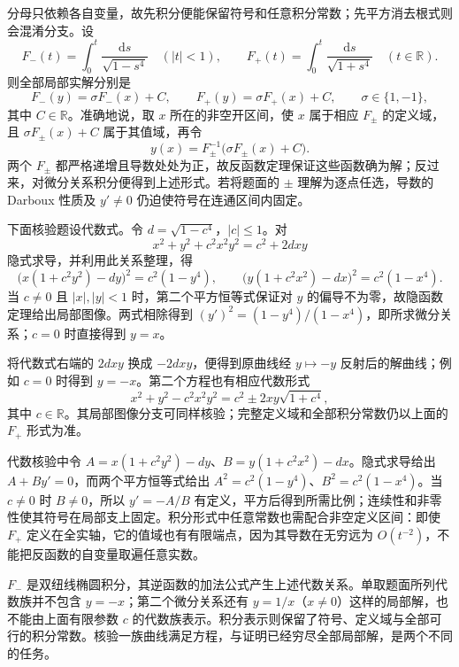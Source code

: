 \documentclass[12pt,fontset=fandol]{ctexart}
\begin{document}
\begin{solve}\label{ans:fin16-low:10}

分母只依赖各自变量，故先积分便能保留符号和任意积分常数；先平方消去根式则会混淆分支。设
\[
F_-(t)=\int_0^t\frac{\mathrm ds}{\sqrt{1-s^4}}\quad(|t|<1),
\qquad
F_+(t)=\int_0^t\frac{\mathrm ds}{\sqrt{1+s^4}}\quad(t\in\mathbb R).
\]
则全部局部实解分别是
\[
\boxed{F_-(y)=\sigma F_-(x)+C},\qquad
\boxed{F_+(y)=\sigma F_+(x)+C},\qquad\sigma\in\{1,-1\},
\]
其中 $C\in\mathbb R$。准确地说，取 $x$ 所在的非空开区间，使 $x$ 属于相应 $F_\pm$ 的定义域，且 $\sigma F_\pm(x)+C$ 属于其值域，再令
\[
y(x)=F_\pm^{-1}\bigl(\sigma F_\pm(x)+C\bigr).
\]
两个 $F_\pm$ 都严格递增且导数处处为正，故反函数定理保证这些函数确为解；反过来，对微分关系积分便得到上述形式。若将题面的 $\pm$ 理解为逐点任选，导数的 Darboux 性质及 $y'\ne0$ 仍迫使符号在连通区间内固定。

下面核验题设代数式。令 $d=\sqrt{1-c^4}$，$|c|\le1$。对
\[
x^2+y^2+c^2x^2y^2=c^2+2dxy
\]
隐式求导，并利用此关系整理，得
\[
\bigl(x(1+c^2y^2)-dy\bigr)^2=c^2(1-y^4),\qquad
\bigl(y(1+c^2x^2)-dx\bigr)^2=c^2(1-x^4).
\]
当 $c\ne0$ 且 $|x|,|y|<1$ 时，第二个平方恒等式保证对 $y$ 的偏导不为零，故隐函数定理给出局部图像。两式相除得到 $(y')^2=(1-y^4)/(1-x^4)$，即所求微分关系；$c=0$ 时直接得到 $y=x$。

将代数式右端的 $2dxy$ 换成 $-2dxy$，便得到原曲线经 $y\mapsto-y$ 反射后的解曲线；例如 $c=0$ 时得到 $y=-x$。第二个方程也有相应代数形式
\[
x^2+y^2-c^2x^2y^2=c^2\pm2xy\sqrt{1+c^4},
\]
其中 $c\in\mathbb R$。其局部图像分支可同样核验；完整定义域和全部积分常数仍以上面的 $F_+$ 形式为准。

代数核验中令 $A=x(1+c^2y^2)-dy$、$B=y(1+c^2x^2)-dx$。隐式求导给出 $A+By'=0$，而两个平方恒等式给出 $A^2=c^2(1-y^4)$、$B^2=c^2(1-x^4)$。当 $c\ne0$ 时 $B\ne0$，所以 $y'=-A/B$ 有定义，平方后得到所需比例；连续性和非零性使其符号在局部支上固定。积分形式中任意常数也需配合非空定义区间：即使 $F_+$ 定义在全实轴，它的值域也有有限端点，因为其导数在无穷远为 $O(t^{-2})$，不能把反函数的自变量取遍任意实数。

\end{solve}

\begin{remark}[方法与条件]$F_-$ 是双纽线椭圆积分，其逆函数的加法公式产生上述代数关系。单取题面所列代数族并不包含 $y=-x$；第二个微分关系还有 $y=1/x$（$x\ne0$）这样的局部解，也不能由上面有限参数 $c$ 的代数族表示。积分表示则保留了符号、定义域与全部可行的积分常数。核验一族曲线满足方程，与证明已经穷尽全部局部解，是两个不同的任务。\end{remark}
\end{document}
